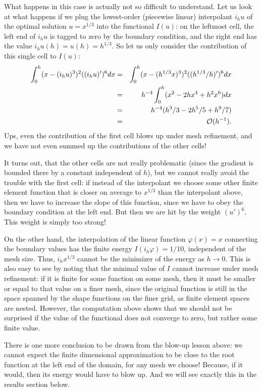 \documentclass{article}
\begin{document}
What happens in this case is actually not so difficult to understand. Let us
look at what happens if we plug the lowest-order (piecewise linear)
interpolant $i_hu$ of the optimal solution $u=x^{1/3}$ into the functional
$I(u)$: on the leftmost cell, the left end of $i_hu$ is tagged to zero by the
boundary condition, and the right end has the value $i_hu(h)=u(h)=h^{1/3}$. So
let us only consider the contribution of this single cell to $I(u)$:
\begin{eqnarray*}
  \int_0^h (x-(i_hu)^3)^2 ((i_hu)')^6 dx
  &=&
  \int_0^h (x-(h^{1/3}x)^3)^2 ((h^{1/3}/h)')^6 dx
  \\
  &=&
  h^{-4} \int_0^h (x^2-2hx^4+h^2x^6) dx
  \\
  &=&
  h^{-4} (h^3/3-2h^5/5+h^9/7)
  \\
  &=& {\cal O}(h^{-1}).
\end{eqnarray*}
Ups, even the contribution of the first cell blows up under mesh refinement,
and we have not even summed up the contributions of the other cells!

It turns out, that the other cells are not really problematic (since the
gradient is bounded there by a constant independent of $h$), but we cannot
really avoid the trouble with the first cell: if instead of the interpolant we
choose some other finite element function that is closer on average to
$x^{1/3}$ than the interpolant above, then we have to increase the slope of
this function, since we have to obey the boundary condition at the left
end. But then we are hit by the weight $(u')^6$. This weight is simply too
strong!

On the other hand, the interpolation of the linear function $\varphi(x)=x$
connecting the boundary values has the finite energy $I(i_h\varphi)=1/10$,
independent of the mesh size. Thus, $i_hx^{1/3}$ cannot be the minimizer of the
energy as $h\rightarrow 0$. This is also easy to see by noting that 
the minimal value of $I$ cannot increase under mesh
refinement: if it is finite for some function on some mesh, then it must be
smaller or equal to that value on a finer mesh, since the original function is
still in the space spanned by the shape functions on the finer grid, as finite
element spaces are nested. However, the computation above shows that we should
not be surprised if the value of the functional does not converge to zero, but
rather some finite value.

There is one more conclusion to be drawn from the blow-up lesson above: we
cannot expect the finite dimensional approximation to be close to the root
function at the left end of the domain, for any mesh we choose! Because, if it
would, then its energy would have to blow up. And we will see exactly this
in the results section below.
\end{document}

